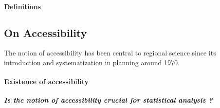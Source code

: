 \paragraph{Definitions}



\subsection{On Accessibility}


The notion of accessibility has been central to regional science since its introduction and systematization in planning around 1970. 

\paragraph{Existence of accessibility}






\textit{\textbf{Is the notion of accessibility crucial for statistical analysis ?}}

\medskip


